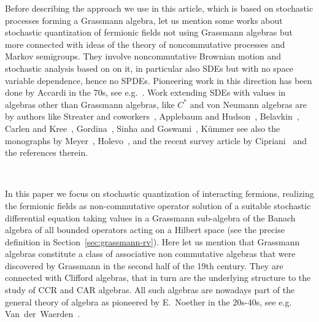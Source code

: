 \documentclass{article}
\begin{document}
Before describing the approach we use in this article, which is based on
stochastic processes forming a Grassmann algebra, let us mention some works
about stochastic quantization of fermionic fields not using Grassmann algebras
but more connected with ideas of the theory of noncommutative processes and
Markov semigroups. They involve noncommutative Brownian motion and stochastic
analysis based on on it, in particular also SDEs but with no space variable
dependence, hence no SPDEs. Pioneering work in this direction has been done by
Accardi in the 70s, see e.g.~{\cite{accardi_outline_2015}}. Work extending
SDEs with values in algebras other than Grassmann algebras, like $C^{\ast}$
and von Neumann algebras are by authors like Streater and
coworkers~{\cite{Streater1,Streater2,Streater3}}, Applebaum and
Hudson~{\cite{Applebaum1,Applebaum2}}, Belavkin~{\cite{Belavkin}}, Carlen and
Kree~{\cite{Carlen1}}, Gordina~{\cite{Gordina}}, Sinha and
Goswami~{\cite{Sinha}}, K{\"u}mmer {\cite{Kummer}} see also the monographs by
Meyer~{\cite{Meyerbook}}, Holevo~{\cite{Holevo}}, and the recent survey
article by Cipriani~{\cite{Cipriani}} and the references therein.

\

In this paper we focus on stochastic quantization of interacting fermions,
realizing the fermionic fields as non-commutative operator solution of a
suitable stochastic differential equation taking values in a Grassmann
sub-algebra of the Banach algebra of all bounded operators acting on a Hilbert
space (see the precise definition in Section~\ref{sec:grassmann-rv}). Here let
us mention that Grassmann algebras constitute a class of associative non
commutative algebras that were discovered by Grassmann in the second half of
the 19th century. They are connected with Clifford algebras, that in turn are
the underlying structure to the study of CCR and CAR algebras. All such
algebras are nowadays part of the general theory of algebra as pioneered by
E.~Noether in the 20s-40s, see e.g.
Van~der~Waerden~{\cite{van2003algebra1,van2003algebra2}}.

\
\end{document}

